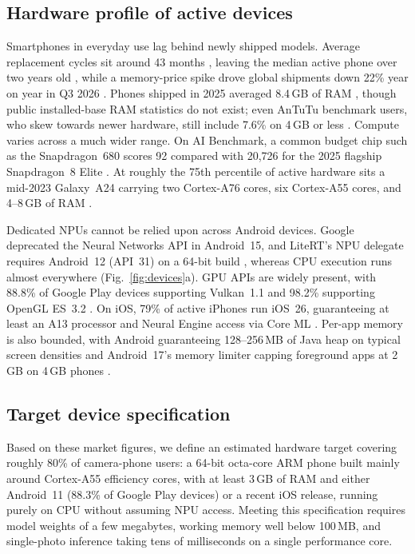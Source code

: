 \documentclass[conference]{IEEEtran}
\begin{document}
\subsection{Hardware profile of active devices}

Smartphones in everyday use lag behind newly shipped models. Average replacement
cycles sit around 43 months \cite{counterpoint2025replacement}, leaving the
median active phone over two years old \cite{russell2025inequality}, while a
memory-price spike drove global shipments down 22\% year on year in Q3 2026
\cite{idc2026q3}. Phones shipped in 2025 averaged 8.4\,GB of RAM
\cite{counterpoint2026dram}, though public installed-base RAM statistics do not
exist; even AnTuTu benchmark users, who skew towards newer hardware, still
include 7.6\% on 4\,GB or less \cite{antutu2026ram}. Compute varies across a
much wider range. On AI Benchmark, a common budget chip such as the
Snapdragon~680 scores 92 compared with 20,726 for the 2025 flagship Snapdragon~8
Elite \cite{aibenchmark2026ranking}. At roughly the 75th percentile of active
hardware sits a mid-2023 Galaxy~A24 carrying two Cortex-A76 cores, six
Cortex-A55 cores, and 4--8\,GB of RAM \cite{russell2025inequality}.

Dedicated NPUs cannot be relied upon across Android devices. Google deprecated
the Neural Networks API in Android~15, and LiteRT's NPU delegate requires
Android~12 (API~31) on a 64-bit build \cite{litert2026}, whereas CPU execution
runs almost everywhere (Fig.~\ref{fig:devices}a). GPU APIs are widely present,
with 88.8\% of Google Play devices supporting Vulkan~1.1 and 98.2\% supporting
OpenGL ES~3.2 \cite{android2025dashboard}. On iOS, 79\% of active iPhones run
iOS~26, guaranteeing at least an A13 processor and Neural Engine access via Core
ML \cite{apple2026adoption}. Per-app memory is also bounded, with Android
guaranteeing 128--256\,MB of Java heap on typical screen densities
\cite{android16cdd} and Android~17's memory limiter capping foreground apps at
2\,GB on 4\,GB phones \cite{android2026memorylimiter}.

\subsection{Target device specification}

Based on these market figures, we define an estimated hardware target covering
roughly 80\% of camera-phone users: a 64-bit octa-core ARM phone built mainly
around Cortex-A55 efficiency cores, with at least 3\,GB of RAM and either
Android~11 (88.3\% of Google Play devices) or a recent iOS release, running
purely on CPU without assuming NPU access. Meeting this specification requires
model weights of a few megabytes, working memory well below 100\,MB, and
single-photo inference taking tens of milliseconds on a single performance core.
\end{document}
